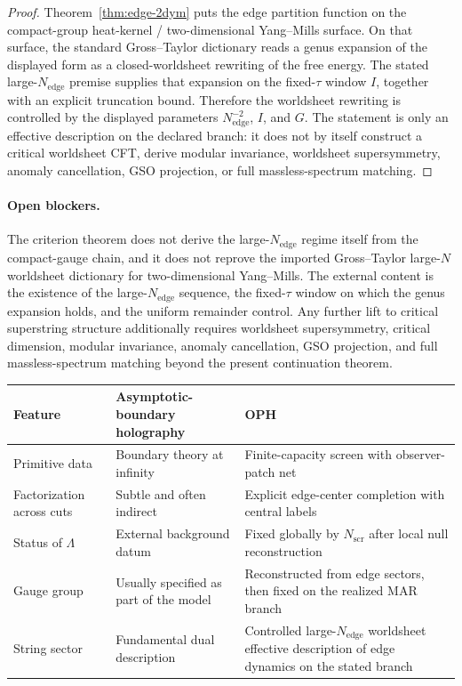 \documentclass[11pt]{article}
\begin{document}
\begin{proof}
Theorem~\ref{thm:edge-2dym} puts the edge partition function on the compact-group heat-kernel /
two-dimensional Yang--Mills surface. On that surface, the standard Gross--Taylor dictionary reads
a genus expansion of the displayed form as a closed-worldsheet rewriting of the free energy. The
stated large-\(N_{\mathrm{edge}}\) premise supplies that expansion on the fixed-\(\tau\) window
\(I\), together with an explicit truncation bound. Therefore the worldsheet rewriting is
controlled by the displayed parameters \(N_{\mathrm{edge}}^{-2}\), \(I\), and \(G\). The
statement is only an effective description on the declared branch: it does not by itself construct
a critical worldsheet CFT, derive modular invariance, worldsheet supersymmetry, anomaly
cancellation, GSO projection, or full massless-spectrum matching.
\end{proof}

\paragraph{Open blockers.}
The criterion theorem does not derive the large-\(N_{\mathrm{edge}}\) regime itself from the compact-gauge
chain, and it does not reprove the imported Gross--Taylor large-\(N\) worldsheet dictionary for
two-dimensional Yang--Mills. The external content is the existence of the large-\(N_{\mathrm{edge}}\)
sequence, the fixed-\(\tau\) window on which the genus expansion holds, and the uniform remainder
control. Any further lift to critical superstring structure additionally requires worldsheet
supersymmetry, critical dimension, modular invariance, anomaly cancellation, GSO projection, and
full massless-spectrum matching beyond the present continuation theorem.

\begingroup
\footnotesize
\begin{tabular}{@{}>{\raggedright\arraybackslash}p{}>{\raggedright\arraybackslash}p{}>{\raggedright\arraybackslash}p{}@{}}
\toprule
Feature & Asymptotic-boundary holography & OPH \\
\midrule
Primitive data & Boundary theory at infinity & Finite-capacity screen with observer-patch net \\
Factorization across cuts & Subtle and often indirect & Explicit edge-center completion with central labels \\
Status of $\Lambda$ & External background datum & Fixed globally by $N_{\mathrm{scr}}$ after local null reconstruction \\
Gauge group & Usually specified as part of the model & Reconstructed from edge sectors, then fixed on the realized MAR branch \\
String sector & Fundamental dual description & Controlled large-$N_{\mathrm{edge}}$ worldsheet effective description of edge dynamics on the stated branch \\
\bottomrule
\end{tabular}
\endgroup
\end{document}
